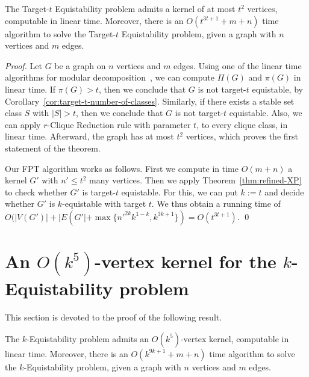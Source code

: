 \documentclass{llncs}
\begin{document}
\begin{theorem}\label{thm:t-equistable}
The {\sc Target-$t$ Equistability} problem admits a kernel of at most $t^2$ vertices, computable in linear time.
Moreover, there is an $O(t^{3t+1} + m + n)$ time algorithm to solve the {\sc Target-$t$ Equistability} problem,
given a graph with $n$ vertices and $m$ edges.
\end{theorem}
\begin{proof}
Let $G$ be a graph on $n$ vertices and $m$ edges.
Using one of the linear time algorithms for modular decomposition~\cite{MR2500307,DBLP:conf/caap/CournierH94,MR1687819}, we can compute $\Pi(G)$ and $\pi(G)$ in linear time.
If $\pi(G)>t$, then we conclude that $G$ is not target-$t$ equistable, by Corollary~\ref{cor:target-t-number-of-classes}.
Similarly, if there exists a stable set class $S$ with $|S|>t$, then we conclude that $G$ is not target-$t$ equistable.
Also, we can apply $r$-Clique Reduction rule with parameter $t$, to every clique class, in linear time.
Afterward, the graph has at most $t^2$ vertices, which proves the first statement of the theorem.

Our FPT algorithm works as follows.
First we compute in time $O(m+n)$ a kernel $G'$ with $n' \le t^2$ many vertices.
Then we apply Theorem~\ref{thm:refined-XP} to check whether $G'$ is target-$t$ equistable.
For this, we can put $k:=t$ and decide whether $G'$ is $k$-equistable with target $t$.
We thus obtain a running time of
\hbox{$O(|V(G')|+|E(G'|+\max\{n'^{2k}k^{1-k},k^{3k+1}\})$}$=O(t^{3t+1})$.
\qed \end{proof}



\section{An $O(k^5)$-vertex kernel for the {\sc $k$-Equistability} problem}\label{sec:k-equi}

This section is devoted to the proof of the following result.

\begin{theorem}\label{thm:k-equistable-fpt}
The {\sc $k$-Equistability} problem admits an $O(k^5)$-vertex kernel, computable in linear time.
Moreover, there is an $O(k^{9k+1} + m + n)$ time algorithm to solve the {\sc $k$-Equistability} problem, given a graph with $n$ vertices and $m$ edges.
\end{theorem}
\end{document}
